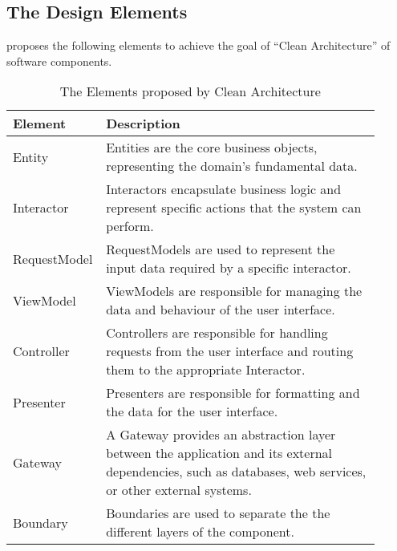 \subsection{The Design Elements} \label{subsec_design_elements} 

\textcite{robert_c_martin_clean_2018} proposes the following elements to achieve
the goal of \enquote{Clean Architecture} of software components.

\begin{table}[H]
    \begin{tabular}{ p{0.17\linewidth} p{0.74\linewidth}}
        \hline
        \textbf{Element} & \textbf{Description} \\ 
        \hline
        Entity & Entities are the core business objects, representing the domain's
        fundamental data.\\ \midrule

        Interactor & Interactors encapsulate business logic and represent specific actions
        that the system can perform. \\ \midrule

        RequestModel & RequestModels are used to represent the input data required by a specific
        interactor.\\ \midrule

        ViewModel & ViewModels are responsible for managing the data and behaviour of the
        user interface. \\ \midrule

        Controller & Controllers are responsible for handling requests from the user
        interface and routing them to the appropriate Interactor.\\ \midrule

        Presenter & Presenters are responsible for formatting and the data for the user
        interface.\\ \midrule

        Gateway & A Gateway provides an abstraction layer between the application and its
        external dependencies, such as databases, web services, or other external
        systems.\\ \midrule

        Boundary & Boundaries are used to separate the the different layers of the component.\\

        \bottomrule
    \end{tabular}
    \caption{The Elements proposed by Clean Architecture}
    \label{ca_element}
\end{table}
